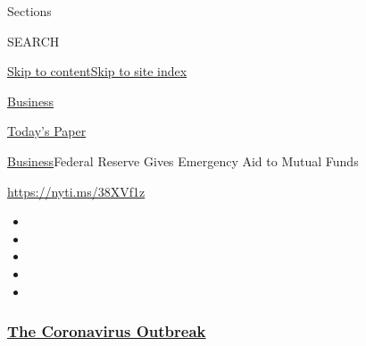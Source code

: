 Sections

SEARCH

\protect\hyperlink{site-content}{Skip to
content}\protect\hyperlink{site-index}{Skip to site index}

\href{https://www.nytimes3xbfgragh.onion/section/business}{Business}

\href{https://myaccount.nytimes3xbfgragh.onion/auth/login?response_type=cookie\&client_id=vi}{}

\href{https://www.nytimes3xbfgragh.onion/section/todayspaper}{Today's
Paper}

\href{/section/business}{Business}\textbar{}Federal Reserve Gives
Emergency Aid to Mutual Funds

\url{https://nyti.ms/38XVf1z}

\begin{itemize}
\item
\item
\item
\item
\item
\end{itemize}

\hypertarget{the-coronavirus-outbreak}{%
\subsubsection{\texorpdfstring{\href{https://www.nytimes3xbfgragh.onion/news-event/coronavirus?name=styln-coronavirus-markets\&region=TOP_BANNER\&block=storyline_menu_recirc\&action=click\&pgtype=Article\&impression_id=210a1420-f2c1-11ea-b3b4-c348a9290e32\&variant=undefined}{The
Coronavirus
Outbreak}}{The Coronavirus Outbreak}}\label{the-coronavirus-outbreak}}

